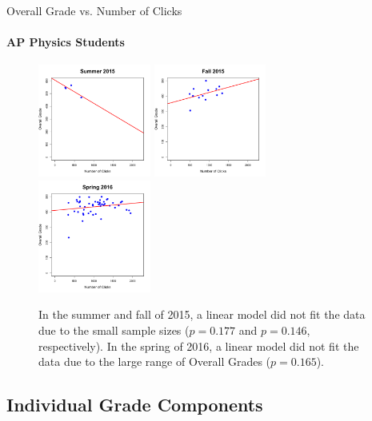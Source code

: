 \documentclass[xcolor=x11names,compress]{beamer}
\begin{document}
\begin{frame}{Overall Grade vs. Number of Clicks}
	\framesubtitle{AP Physics Students}
	\begin{figure}
		\centering
		\includegraphics[width=0.33\textwidth]{img/overall_grade_vs_clicks_su15_ap_students.pdf}
		\includegraphics[width=0.33\textwidth]{img/overall_grade_vs_clicks_fa15_ap_students.pdf}
		\includegraphics[width=0.33\textwidth]{img/overall_grade_vs_clicks_sp16_ap_students.pdf}
		\caption{In the summer and fall of 2015, a linear model did not fit the data due to the small sample sizes ($p = 0.177$ and $p = 0.146$, respectively). In the spring of 2016, a linear model did not fit the data due to the large range of Overall Grades ($p = 0.165$).}
		\label{fig:overall_grade_vs_clicks_ap_students}
	\end{figure}
\end{frame}

\subsection{Individual Grade Components}
\end{document}
